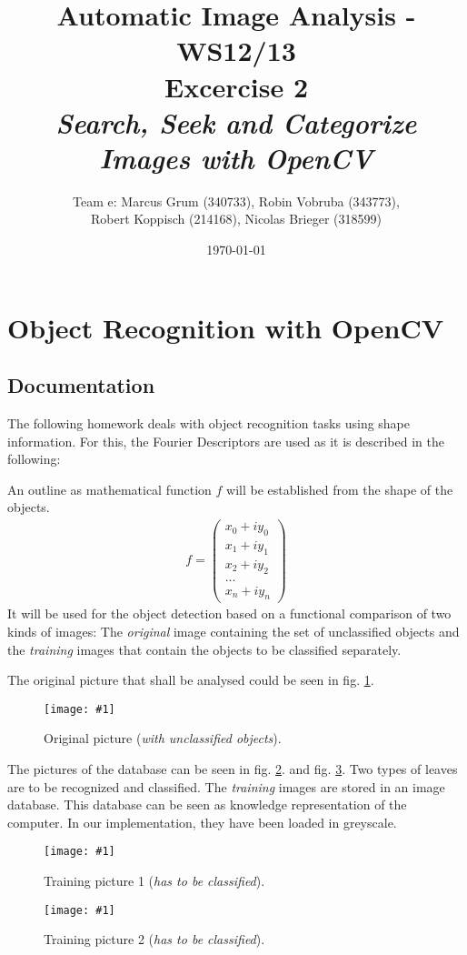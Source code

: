 \documentclass[a4paper,headings=small]{scrartcl}
\title{Automatic Image Analysis - WS12/13 \\ Excercise 2 \\ \emph{Search, Seek and Categorize Images with OpenCV}}
\author{Team e: Marcus Grum (340733), Robin Vobruba (343773), \\ Robert Koppisch (214168), Nicolas Brieger (318599)}
\date{\today}
\numberwithin{equation}{section} %
\numberwithin{figure}{section}   %
\newcommand{\image}[3]{
	\begin{figure}[htbp]
		\centering
		\texttt{[image: \#1]}
		\caption{#3}
		\label{fig:#1}
	\end{figure}
}
\newcommand{\generatedImgRoot}{../../../target}
\begin{document}
\maketitle



\section{Object Recognition with OpenCV}


\subsection{Documentation}

The following homework deals with object recognition tasks using shape information.
For this, the Fourier Descriptors are used as it is described in the following:

An outline as mathematical function $f$ will be established from the shape of the objects.
\begin{align}
f=\begin{pmatrix} x_0 + i y_0 \\ x_1 + i y_1 \\ x_2 + i y_2 \\ ... \\ x_n + i y_n \end{pmatrix} 
\end{align}
It will be used for the object detection based on a functional comparison of two kinds of images:
The \emph{original} image containing the set of unclassified objects 
and the \emph{training} images that contain the objects to be classified separately.

The original picture that shall be analysed could be seen in fig. \ref{fig:\generatedImgRoot/pic_input}.

\image{\generatedImgRoot/pic_input}{1}{%
		Original picture (\emph{with unclassified objects}).}

The pictures of the database can be seen in fig. \ref{fig:\generatedImgRoot/pic_db1}.
and fig. \ref{fig:\generatedImgRoot/pic_db2}. Two types of leaves are to be
recognized and classified. The \emph{training} images are stored in an image database. 
This database can be seen as knowledge representation of the computer. 
In our implementation, they have been loaded in greyscale.

\image{\generatedImgRoot/pic_db1}{0.2}{%
		Training picture 1 (\emph{has to be classified}).}
\image{\generatedImgRoot/pic_db2}{0.5}{%
		Training picture 2 (\emph{has to be classified}).}
\end{document}
